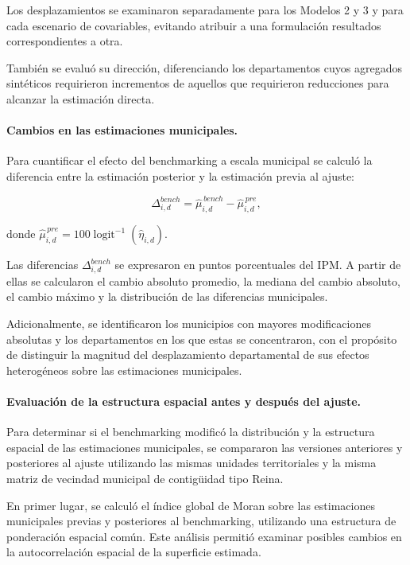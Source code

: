 Los desplazamientos se examinaron separadamente para los Modelos 2 y 3 y para cada escenario de covariables, evitando atribuir a una formulación resultados correspondientes a otra.

También se evaluó su dirección, diferenciando los departamentos cuyos agregados sintéticos requirieron incrementos de aquellos que requirieron reducciones para alcanzar la estimación directa.

\paragraph{Cambios en las estimaciones municipales.}

Para cuantificar el efecto del benchmarking a escala municipal se calculó la diferencia entre la estimación posterior y la estimación previa al ajuste:

\begin{equation}
\Delta_{i,d}^{bench}
=
\widehat{\mu}_{i,d}^{\,bench}
-
\widehat{\mu}_{i,d}^{\,pre},
\label{eq:met-cambio-benchmark}
\end{equation}

donde $\widehat{\mu}_{i,d}^{\,pre}
=100\operatorname{logit}^{-1}(\widehat{\eta}_{i,d})$.

Las diferencias $\Delta_{i,d}^{bench}$ se expresaron en puntos porcentuales del IPM. A partir de ellas se calcularon el cambio absoluto promedio, la mediana del cambio absoluto, el cambio máximo y la distribución de las diferencias municipales.

Adicionalmente, se identificaron los municipios con mayores modificaciones absolutas y los departamentos en los que estas se concentraron, con el propósito de distinguir la magnitud del desplazamiento departamental de sus efectos heterogéneos sobre las estimaciones municipales.

\paragraph{Evaluación de la estructura espacial antes y después del ajuste.}

Para determinar si el benchmarking modificó la distribución y la estructura espacial de las estimaciones municipales, se compararon las versiones anteriores y posteriores al ajuste utilizando las mismas unidades territoriales y la misma matriz de vecindad municipal de contigüidad tipo Reina.

En primer lugar, se calculó el índice global de Moran sobre las estimaciones municipales previas y posteriores al benchmarking, utilizando una estructura de ponderación espacial común. Este análisis permitió examinar posibles cambios en la autocorrelación espacial de la superficie estimada.

